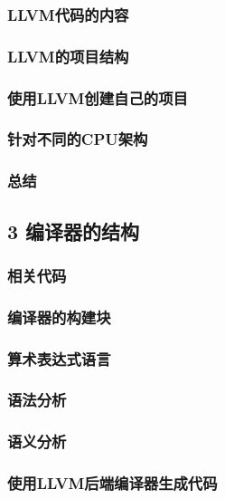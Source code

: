 \documentclass[11pt,a4paper,UTF8]{ctexart}
\begin{document}
		\subsubsection{LLVM代码的内容}
		\subsubsection{LLVM的项目结构}
		\subsubsection{使用LLVM创建自己的项目}
		\subsubsection{针对不同的CPU架构}
		\subsubsection{总结}
	\subsection{3 编译器的结构}
		\subsubsection{相关代码}
		\subsubsection{编译器的构建块}
		\subsubsection{算术表达式语言}
		\subsubsection{语法分析}
		\subsubsection{语义分析}
		\subsubsection{使用LLVM后端编译器生成代码}
\end{document}
